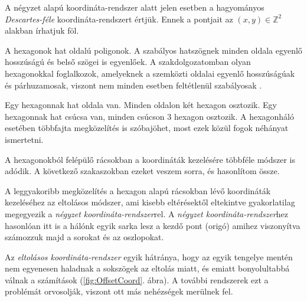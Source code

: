 

A négyzet alapú koordináta-rendszer alatt jelen esetben a hagyományos \textit{Descartes-féle} koordináta-rendszert értjük. Ennek a pontjait az $(x, y) \in \mathbb{Z}^2$ alakban írhatjuk föl.


\label{sec:hexagon}

A hexagonok hat oldalú poligonok. A szabályos hatszögnek minden oldala egyenlő hosszúságú és belső szögei is egyenlőek. A szakdolgozatomban olyan hexagonokkal foglalkozok, amelyeknek a szemközti oldalai egyenlő hosszúságúak és párhuzamosak, viszont nem minden esetben feltétlenül szabályosak \cite{HexWiki}.

Egy hexagonnak hat oldala van. Minden oldalon két hexagon osztozik. Egy hexagonnak hat csúcsa van, minden csúcson 3 hexagon osztozik. A hexagonháló esetében többfajta megközelítés is szóbajöhet, most ezek közül fogok néhányat ismertetni.

A hexagonokból felépülő rácsokban a koordináták kezelésére többféle módszer is adódik. A következő szakaszokban ezeket veszem sorra, és hasonlítom össze.


A leggyakoribb megközelítés a hexagon alapú rácsokban lévő koordináták kezeléséhez az eltolásos módszer, ami kisebb eltérésektől eltekintve gyakorlatilag megegyezik a \textit{négyzet koordináta-rendszer}rel. A \textit{négyzet koordináta-rendszer}hez hasonlóan itt is a hálónk egyik sarka lesz a kezdő pont (origó) amihez viszonyítva számozzuk majd a sorokat és az oszlopokat.

Az \textit{eltolásos koordináta-rendszer} egyik hátránya, hogy az egyik tengelye mentén nem egyenesen haladnak a sokszögek az eltolás miatt, és emiatt bonyolultabbá válnak a számítások (\ref{fig:OffsetCoord}. ábra). A további rendszerek ezt a problémát orvosolják, viszont ott más nehézségek merülnek fel.	

